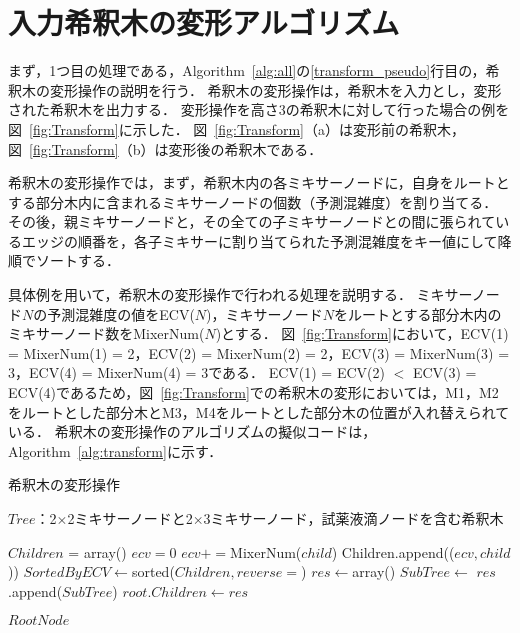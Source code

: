 \section{入力希釈木の変形アルゴリズム}
まず，1つ目の処理である，Algorithm~\ref{alg:all}の\ref{transform_pseudo}行目の，希釈木の変形操作の説明を行う． 希釈木の変形操作は，希釈木を入力とし，変形された希釈木を出力する． 変形操作を高さ3の希釈木に対して行った場合の例を図~\ref{fig:Transform}に示した．
図~\ref{fig:Transform}（a）は変形前の希釈木，図~\ref{fig:Transform}（b）は変形後の希釈木である．

希釈木の変形操作では，まず，希釈木内の各ミキサーノードに，自身をルートとする部分木内に含まれるミキサーノードの個数（予測混雑度）を割り当てる．
その後，親ミキサーノードと，その全ての子ミキサーノードとの間に張られているエッジの順番を，各子ミキサーに割り当てられた予測混雑度をキー値にして降順でソートする． 

具体例を用いて，希釈木の変形操作で行われる処理を説明する．
ミキサーノード$N$の予測混雑度の値をECV($N$)，ミキサーノード$N$をルートとする部分木内のミキサーノード数をMixerNum($\mathit{N}$)とする．
図~\ref{fig:Transform}において，ECV(1) = MixerNum(1) = 2，ECV(2) = MixerNum(2) = 2，ECV(3) = MixerNum(3) = 3，ECV(4) = MixerNum(4) = 3である．
ECV(1) = ECV(2) $<$ ECV(3) = ECV(4)であるため，図~\ref{fig:Transform}での希釈木の変形においては，M1，M2をルートとした部分木とM3，M4をルートとした部分木の位置が入れ替えられている．
希釈木の変形操作のアルゴリズムの擬似コードは，Algorithm~\ref{alg:transform}に示す．




\begin{algorithm}[tbp]
 \caption{希釈木の変形操作}\label{alg:transform}
 \begin{algorithmic}[1]
     \Require $\mathit{Tree}$：2$\times$2ミキサーノードと2$\times$3ミキサーノード，試薬液滴ノードを含む希釈木 

        \State $\mathit{Children}$ = array()
            \State $\mathit{ecv}=0$
                \State $\mathit{ecv}+=$MixerNum($child$) 
            \EndIf 
            \State Children.append(($\mathit{ecv,child}$))
        \EndFor 
        \State $\mathit{SortedByECV} \gets $sorted($Children,reverse=$\True)
        \State $\mathit{res}\gets$array()
            \State $\mathit{SubTree}\gets $
            \State $\mathit{res}$.append($\mathit{SubTree}$)
        \EndFor 
        \State $\mathit{root.Children}\gets \mathit{res}$ 

        \Return $\mathit{RootNode}$
    \EndFunction 

 \end{algorithmic}
\end{algorithm}


